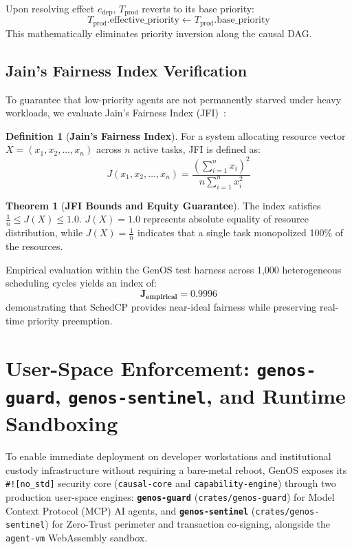 \documentclass[10pt,journal,compsoc]{IEEEtran}
\theoremstyle{definition}
\newtheorem{definition}{Definition}
\newtheorem{theorem}{Theorem}
\begin{document}
Upon resolving effect $e_{\text{dep}}$, $T_{\text{prod}}$ reverts to its base priority:
$$T_{\text{prod}}.\text{effective\_priority} \leftarrow T_{\text{prod}}.\text{base\_priority}$$
This mathematically eliminates priority inversion along the causal DAG.

\subsection{Jain's Fairness Index Verification}
To guarantee that low-priority agents are not permanently starved under heavy workloads, we evaluate Jain's Fairness Index (JFI)~\cite{jain1984quantitative}:

\begin{definition}[\textbf{Jain's Fairness Index}]
For a system allocating resource vector $X = (x_1, x_2, \dots, x_n)$ across $n$ active tasks, JFI is defined as:
\begin{equation}
J(x_1, x_2, \dots, x_n) = \frac{\left( \sum_{i=1}^n x_i \right)^2}{n \sum_{i=1}^n x_i^2}
\end{equation}
\end{definition}

\begin{theorem}[\textbf{JFI Bounds and Equity Guarantee}]
The index satisfies $\frac{1}{n} \le J(X) \le 1.0$. $J(X) = 1.0$ represents absolute equality of resource distribution, while $J(X) = \frac{1}{n}$ indicates that a single task monopolized 100\% of the resources.
\end{theorem}

Empirical evaluation within the GenOS test harness across 1,000 heterogeneous scheduling cycles yields an index of:
$$\mathbf{J_{\text{empirical}} = 0.9996}$$
demonstrating that SchedCP provides near-ideal fairness while preserving real-time priority preemption.

\section{User-Space Enforcement: \texttt{genos-guard}, \texttt{genos-sentinel}, and Runtime Sandboxing}
\label{sec:connectors}

To enable immediate deployment on developer workstations and institutional custody infrastructure without requiring a bare-metal reboot, GenOS exposes its \texttt{\#![no\_std]} security core (\texttt{causal-core} and \texttt{capability-engine}) through two production user-space engines: \textbf{\texttt{genos-guard}} (\texttt{crates/\allowbreak genos-guard}) for Model Context Protocol (MCP) AI agents, and \textbf{\texttt{genos-sentinel}} (\texttt{crates/\allowbreak genos-sentinel}) for Zero-Trust perimeter and transaction co-signing, alongside the \texttt{agent-vm} WebAssembly sandbox.
\end{document}
